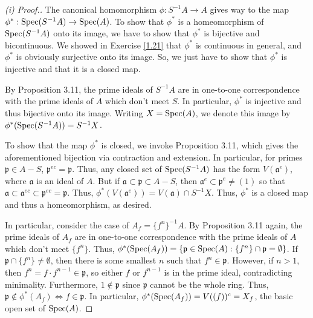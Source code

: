 \begin{proof}[(i) Proof.]
The canonical homomorphism $\phi : S^{-1}A \to A$ gives way to the map $\phi^* : \operatorname{Spec}(S^{-1}A) \to \operatorname{Spec}(A)$. To show that $\phi^*$ is a homeomorphism of $\operatorname{Spec}(S^{-1}A)$ onto its
image, we have to show that $\phi^*$ is bijective and bicontinuous. We showed in Exercise \ref{1.21} that $\phi^*$ is continuous in general, and $\phi^*$ is obviously surjective onto its image.
So, we just have to show that $\phi^*$ is injective and that it is a closed map. 

By Proposition 3.11, the prime ideals of $S^{-1}A$ are in one-to-one correspondence with the prime ideals of $A$ which don't meet $S$. In particular, $\phi^*$ is injective and thus bijective
onto its image. Writing $X = \operatorname{Spec}(A)$, we denote this image by $\phi^*(\operatorname{Spec}(S^{-1}A)) = S^{-1}X$.

To show that the map $\phi^*$ is closed, we invoke Proposition 3.11, which gives the aforementioned bijection via contraction and extension. In particular, for primes $\mathfrak{p} \in A - S$, 
$\mathfrak{p}^{ec} = \mathfrak{p}$. Thus, any closed set of $\operatorname{Spec}(S^{-1}A)$ has the form $V(\mathfrak{a}^e)$, where $\mathfrak{a}$ is an ideal of $A$. But if $\mathfrak{a} \subset \mathfrak{p} \subset A - S$,
then $\mathfrak{a}^e \subset \mathfrak{p}^e \neq (1)$ so that $\mathfrak{a} \subset \mathfrak{a}^{ec} \subset \mathfrak{p}^{ec} = \mathfrak{p}$. Thus, $\phi^*(V(\mathfrak{a}^e)) = V(\mathfrak{a}) \cap S^{-1}X$.
Thus, $\phi^*$ is a closed map and thus a homeomorphism, as desired.

In particular, consider the case of $A_f = \{f^n\}^{-1}A$. By Proposition 3.11 again, the prime ideals of $A_f$ are in one-to-one correspondence with the prime 
ideals of $A$ which don't meet $\{f^n\}$. Thus, $\phi^*(\operatorname{Spec}(A_f)) = \{\mathfrak{p} \in \operatorname{Spec}(A) : \{f^n\} \cap \mathfrak{p} = \emptyset\}$. If $\mathfrak{p} \cap \{f^n\} \neq \emptyset$, then there is some
smallest $n$ such that $f^n \in \mathfrak{p}$. However, if $n>1$, then $f^n = f \cdot f^{n-1} \in \mathfrak{p}$, so either $f$ or $f^{n-1}$ is in the prime ideal, contradicting minimality. Furthermore,
$1 \not\in \mathfrak{p}$ since $\mathfrak{p}$ cannot be the whole ring. Thus, $\mathfrak{p} \not\in \phi^*(A_f) \iff f \in \mathfrak{p}$. In particular, $\phi^*(\operatorname{Spec}(A_f)) = V((f))^c = X_f$, the basic open set
of $\operatorname{Spec}(A)$.
\end{proof}

